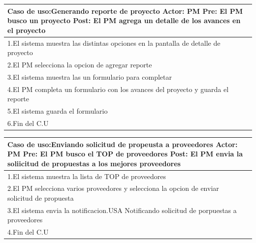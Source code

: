 \begin{longtable}{|p{}|p{}|}
    \hline
    \multicolumn{2}{|p{16cm}|}{
        \textbf{Caso de uso:}Generando reporte de proyecto\newline
        \textbf{Actor:} PM\newline
        \textbf{Pre: }El PM busco un proyecto\newline
        \textbf{Post:} El PM agrega un detalle de los avances en el proyecto
    }\\
    \hline
    1.El sistema muestra las distintas opciones en la pantalla de detalle de proyecto& \\
    \hline
    2.El PM selecciona la opcion de agregar reporte &\\
    \hline
    3.El sistema muestra las un formulario para completar& \\
    \hline
    4.El PM completa un formulario con los avances del proyecto y guarda el reporte&\\
    \hline
    5.El sistema guarda el formulario&\\
    \hline
    6.Fin del C.U&\\
    \hline
\end{longtable}


\begin{longtable}{|p{}|p{}|}
    \hline
    \multicolumn{2}{|p{16cm}|}{
        \textbf{Caso de uso:}Enviando solicitud de propeusta a proveedores\newline
        \textbf{Actor:} PM\newline
        \textbf{Pre: }El PM busco el TOP de proveedores\newline
        \textbf{Post:} El PM envia la soliicitud de propuestas a los mejores proveedores
    }\\
    \hline
    1.El sistema muestra la lista de TOP de proveedores & \\
    \hline
    2.El PM selecciona varios proveedores y selecciona la opcion de enviar solicitud de propuesta& \\
    \hline
    3.El sistema envia la notificacion.USA Notificando solicitud de porpuestas a proveedores& \\
    \hline
    4.Fin del C.U&\\
    \hline
\end{longtable}

